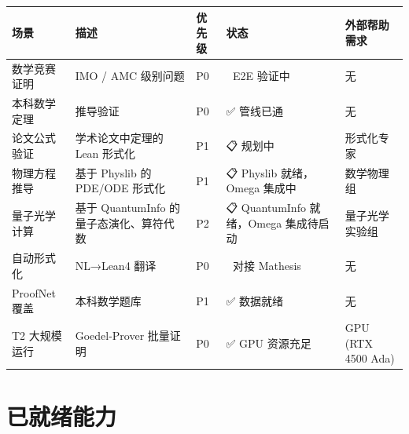 \documentclass[
  11pt,
  a4paper,
]{ctexrep}
\newcounter{none} %
\begin{document}
{\def\LTcaptype{none} %
\begin{longtable}[]{@{}
  >{\raggedright\arraybackslash}p{}
  >{\raggedright\arraybackslash}p{}
  >{\raggedright\arraybackslash}p{}
  >{\raggedright\arraybackslash}p{}
  >{\raggedright\arraybackslash}p{}@{}}
\toprule\noalign{}
\begin{minipage}[b]{\linewidth}\raggedright
场景
\end{minipage} & \begin{minipage}[b]{\linewidth}\raggedright
描述
\end{minipage} & \begin{minipage}[b]{\linewidth}\raggedright
优先级
\end{minipage} & \begin{minipage}[b]{\linewidth}\raggedright
状态
\end{minipage} & \begin{minipage}[b]{\linewidth}\raggedright
外部帮助需求
\end{minipage} \\
\midrule\noalign{}
\endhead
\bottomrule\noalign{}
\endlastfoot
数学竞赛证明 & IMO / AMC 级别问题 & P0 & 🔄 E2E 验证中 & 无 \\
本科数学定理 & 推导验证 & P0 & ✅ 管线已通 & 无 \\
论文公式验证 & 学术论文中定理的 Lean 形式化 & P1 & 📋 规划中 &
形式化专家 \\
物理方程推导 & 基于 Physlib 的 PDE/ODE 形式化 & P1 & 📋 Physlib
就绪，Omega 集成中 & 数学物理组 \\
量子光学计算 & 基于 QuantumInfo 的量子态演化、算符代数 & P2 & 📋
QuantumInfo 就绪，Omega 集成待启动 & 量子光学实验组 \\
自动形式化 & NL→Lean4 翻译 & P0 & 🔄 对接 Mathesis & 无 \\
ProofNet 覆盖 & 本科数学题库 & P1 & ✅ 数据就绪 & 无 \\
T2 大规模运行 & Goedel-Prover 批量证明 & P0 & ✅ GPU 资源充足 & GPU (RTX
4500 Ada) \\
\end{longtable}
}

\section{已就绪能力}\label{sec-ready}
\end{document}
